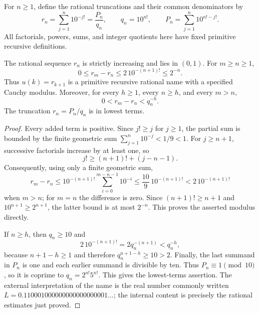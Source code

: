 For $n\ge1$, define the rational truncations and their common denominators
by
\[
 r_n=\sum_{j=1}^n10^{-j!}=\frac{P_n}{q_n},\qquad
 q_n=10^{n!},\qquad P_n=\sum_{j=1}^n10^{n!-j!}.
\]
All factorials, powers, sums, and integer quotients here have fixed
primitive recursive definitions.

\begin{theorem}
\label{tr:name}
The rational sequence $r_n$ is strictly increasing and lies in $(0,1)$.
For $m\ge n\ge1$,
\[
 0\le r_m-r_n\le2\,10^{-(n+1)!}\le2^{-n}.
\]
Thus $u(k)=r_{k+1}$ is a primitive recursive rational name with a
specified Cauchy modulus. Moreover, for every $h\ge1$, every $n\ge h$,
and every $m>n$,
\[
 0<r_m-r_n<q_n^{-h}.
\]
The truncation $r_n=P_n/q_n$ is in lowest terms.
\end{theorem}
\begin{proof}
Every added term is positive. Since $j!\ge j$ for $j\ge1$, the
partial sum is bounded by the finite geometric sum
$\sum_{j=1}^n10^{-j}<1/9<1$. For $j\ge n+1$, successive factorials
increase by at least one, so
\[
 j!\ge(n+1)!+(j-n-1).
\]
Consequently, using only a finite geometric sum,
\[
 r_m-r_n\le10^{-(n+1)!}
       \sum_{i=0}^{m-n-1}10^{-i}
       \le\frac{10}{9}\,10^{-(n+1)!}
       <2\,10^{-(n+1)!}
\]
when $m>n$; for $m=n$ the difference is zero. Since
$(n+1)!\ge n+1$ and $10^{n+1}\ge2^{n+1}$, the latter bound is
at most $2^{-n}$. This proves the asserted modulus directly.

If $n\ge h$, then $q_n\ge10$ and
\[
 2\,10^{-(n+1)!}=2q_n^{-(n+1)}<q_n^{-h},
\]
because $n+1-h\ge1$ and therefore $q_n^{n+1-h}\ge10>2$.
Finally, the last summand in $P_n$ is one and each earlier summand
is divisible by ten. Thus $P_n\equiv1\pmod{10}$, so it is
coprime to $q_n=2^{n!}5^{n!}$. This gives the lowest-terms assertion.
The external interpretation of the name is the real number commonly
written $L=0.110001000000000000000001\ldots$; the internal content
is precisely the rational estimates just proved.
\end{proof}


